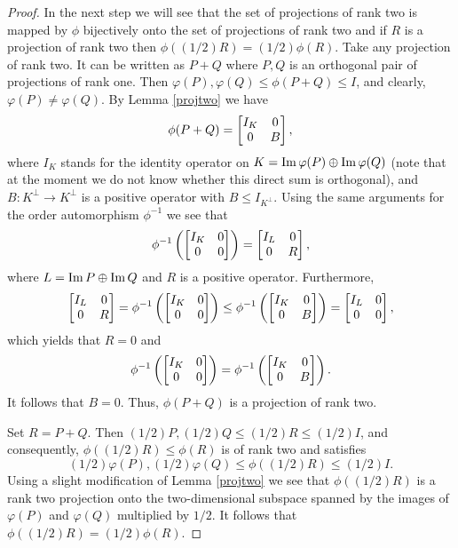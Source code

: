\documentclass{article}
\begin{document}
\begin{proof}
In the next step we will see that the set of projections of rank two is mapped by $\phi$ bijectively onto the set of projections of rank two and if $R$ is a projection of rank two then $\phi ((1/2)R) = (1/2)\phi (R)$. Take any projection of rank two. It can be written as $P+Q$ where $P,Q$ is an orthogonal pair of projections of rank one. Then $\varphi (P), \varphi (Q) \le \phi (P+Q) \le I$, and clearly, $\varphi(P) \not= \varphi (Q)$.
By Lemma \ref{projtwo} we have
$$
\phi (P+Q) = \left[ \begin{matrix} I_K & 0 \cr 0 & B \cr \end{matrix} \right],
$$
where $I_K$ stands for the identity operator on 
$K = {\rm Im}\, \varphi (P) \oplus {\rm Im}\, \varphi (Q)$ 
(note that at the moment we do not know whether this direct sum is orthogonal), 
and $B :  K^\perp \to K^\perp$ is a positive operator with 
$B \le I_{K^\perp}$. Using the same arguments for the order automorphism $\phi^{-1}$ we see that
$$
\phi^{-1} \left(  \left[ \begin{matrix} I_K & 0 \cr 0 & 0 \cr \end{matrix} \right] \right) =  \left[ \begin{matrix} I_L & 0 \cr 0 & R \cr \end{matrix} \right],
$$
where $L =  {\rm Im}\, P \oplus {\rm Im}\, Q$ and $R$ is a positive operator. Furthermore,
$$
\left[ \begin{matrix} I_L & 0 \cr 0 & R \cr \end{matrix} \right] = \phi^{-1} \left(  \left[ \begin{matrix} I_K & 0 \cr 0 & 0 \cr \end{matrix} \right] \right)  \le \phi^{-1} \left(  \left[ \begin{matrix} I_K & 0 \cr 0 & B \cr \end{matrix} \right] \right) 
= \left[ \begin{matrix} I_L & 0 \cr 0 & 0 \cr \end{matrix} \right],
$$
which yields that $R=0$ and
$$
\phi^{-1} \left(  \left[ \begin{matrix} I_K & 0 \cr 0 & 0 \cr \end{matrix} \right] \right)  = \phi^{-1} \left(  \left[ \begin{matrix} I_K & 0 \cr 0 & B \cr \end{matrix} \right] \right) .
$$
It follows that $B=0$. Thus, $\phi (P+Q)$ is a projection of rank two.

Set $R = P+Q$. Then $(1/2)P , (1/2)Q \le (1/2)R \le (1/2)I$, and consequently, $\phi((1/2)R) \le \phi (R)$ is of rank two and satisfies
$$
(1/2) \varphi (P) , (1 /2) \varphi (Q) \le \phi ((1/2)R) \le (1/2)I .
$$
Using a slight modification of Lemma \ref{projtwo} we see that $ \phi ((1/2)R)$ is a rank two projection onto the two-dimensional subspace spanned by the images of $\varphi (P)$ and $\varphi (Q)$ multiplied by $1/2$. It follows that 
$\phi ((1/2)R) = (1/2)\phi (R)$.


\end{proof}
\end{document}
